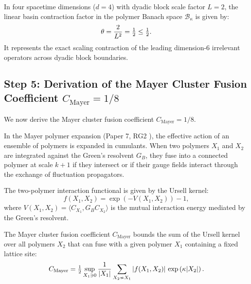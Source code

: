 \begin{proposition}
\label{prop:theta_derivation}
In four spacetime dimensions ($d = 4$) with dyadic block scale factor $L = 2$, the linear basin contraction factor in the polymer Banach space $\mathcal{B}_\kappa$ is given by:
\begin{equation}
\theta = \frac{2}{L^2} = \tfrac{1}{2} \le \tfrac{1}{2}.
\end{equation}
It represents the exact scaling contraction of the leading dimension-6 irrelevant operators across dyadic block boundaries.
\end{proposition}

\subsection{Step 5: Derivation of the Mayer Cluster Fusion Coefficient \texorpdfstring{$C_{\mathrm{Mayer}} = 1/8$}{C_Mayer = 1/8}}
\label{subsec:step5_mayer_derivation}

We now derive the Mayer cluster fusion coefficient $C_{\mathrm{Mayer}} = 1/8$.

In the Mayer polymer expansion (Paper 7, RG2 \cite{Balaban1988}), the effective action of an ensemble of polymers is expanded in cumulants. When two polymers $X_1$ and $X_2$ are integrated against the Green's resolvent $G_B$, they fuse into a connected polymer at scale $k+1$ if they intersect or if their gauge fields interact through the exchange of fluctuation propagators.

The two-polymer interaction functional is given by the Ursell kernel:
\begin{equation}
\label{eq:ch14_ursell_two_polymer}
f(X_1, X_2) = \exp\left( -V(X_1, X_2) \right) - 1,
\end{equation}
where $V(X_1, X_2) = \langle C_{X_1}, G_B C_{X_2} \rangle$ is the mutual interaction energy mediated by the Green's resolvent.

The Mayer cluster fusion coefficient $C_{\mathrm{Mayer}}$ bounds the sum of the Ursell kernel over all polymers $X_2$ that can fuse with a given polymer $X_1$ containing a fixed lattice site:
\begin{equation}
\label{eq:ch14_cmayer_definition_integral}
C_{\mathrm{Mayer}} = \tfrac{1}{2} \sup_{X_1 \ni 0} \frac{1}{|X_1|} \sum_{X_2 \nsim X_1} \left| f(X_1, X_2) \right| \, \exp\left( \kappa |X_2| \right).
\end{equation}

